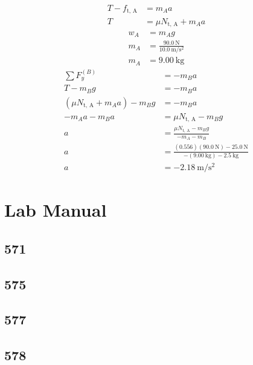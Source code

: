 \documentclass{article}
\begin{document}
\begin{enumerate}[label=\textbf{(\alph*)}]
\begin{align*}
			T - f_\text{t, A} & = m_Aa \\
			T & = \mu N_\text{t, A} + m_Aa
		\end{align*}
		\begin{align*}
			w_A & = m_Ag \\
			m_A & = \frac{\SI{90.0}{\newton}}{\SI{10.0}{\meter \per \second \squared}} \\
			m_A & = \SI{9.00}{\kilogram}
		\end{align*}
		\begin{align*}
			\sum F_y^{(B)} & = -m_Ba \\
			T - m_Bg & = -m_Ba \\
			(\mu N_\text{t, A} + m_Aa) - m_Bg & = -m_Ba \\
			-m_Aa - m_Ba & = \mu N_\text{t, A} - m_Bg \\
			a & = \frac{\mu N_\text{t, A} - m_Bg}{-m_A - m_B} \\
			a & = \frac{(0.556)(\SI{90.0}{\newton}) - \SI{25.0}{\newton}}{-(\SI{9.00}{\kilogram}) - \SI{2.5}{\kilogram}} \\
			a & = \SI{-2.18}{\meter \per \second \squared}
		\end{align*}
\end{enumerate}

\section{Lab Manual}

\subsection{571}

\subsection{575}

\subsection{577}

\subsection{578}
\end{document}
